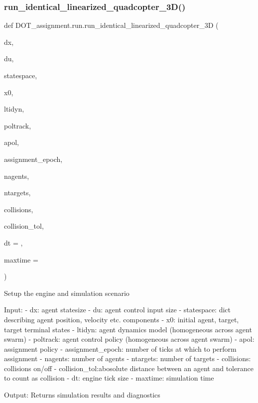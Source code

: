 \subsubsection{\texorpdfstring{run\_identical\_linearized\_quadcopter\_3D()}{run\_identical\_linearized\_quadcopter\_3D()}}
{\footnotesize\ttfamily def D\+O\+T\+\_\+assignment.\+run.\+run\+\_\+identical\+\_\+linearized\+\_\+quadcopter\+\_\+3D (\begin{DoxyParamCaption}\item[{}]{dx,  }\item[{}]{du,  }\item[{}]{statespace,  }\item[{}]{x0,  }\item[{}]{ltidyn,  }\item[{}]{poltrack,  }\item[{}]{apol,  }\item[{}]{assignment\+\_\+epoch,  }\item[{}]{nagents,  }\item[{}]{ntargets,  }\item[{}]{collisions,  }\item[{}]{collision\+\_\+tol,  }\item[{}]{dt = {},  }\item[{}]{maxtime = {} }\end{DoxyParamCaption})}

\begin{DoxyVerb}Setup the engine and simulation scenario

Input:
    - dx:           agent statesize
    - du:           agent control input size
    - statespace:   dict describing agent position, velocity etc. components
    - x0:           initial agent, target, target terminal states
    - ltidyn:       agent dynamics model (homogeneous across agent swarm)
    - poltrack:     agent control policy (homogeneous across agent swarm)
    - apol:         assignment policy
    - assignment_epoch: number of ticks at which to perform assignment
    - nagents:      number of agents
    - ntargets:      number of targets
    - collisions:   collisions on/off
    - collision_tol:abosolute distance between an agent and tolerance to count as collision
    - dt:           engine tick size
    - maxtime:      simulation time

Output: Returns simulation results and diagnostics\end{DoxyVerb}
 